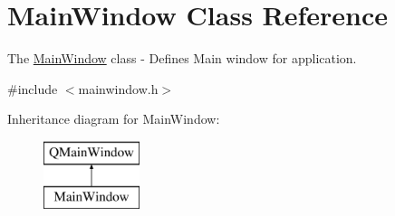 \hypertarget{class_main_window}{}\section{Main\+Window Class Reference}
\label{class_main_window}


The \hyperlink{class_main_window}{Main\+Window} class -\/ Defines Main window for application.  




{\ttfamily \#include $<$mainwindow.\+h$>$}

Inheritance diagram for Main\+Window\+:\begin{figure}[H]
\begin{center}
\leavevmode
\includegraphics[height=2.000000cm]{class_main_window}
\end{center}
\end{figure}
